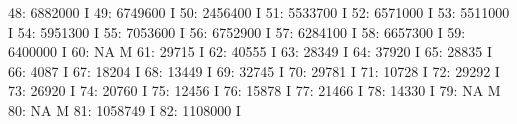 \documentclass[nojss]{jss}
\begin{document}
\begin{Schunk}
\begin{Soutput}
 48:                    6882000                                          I
 49:                    6749600                                          I
 50:                    2456400                                          I
 51:                    5533700                                          I
 52:                    6571000                                          I
 53:                    5511000                                          I
 54:                    5951300                                          I
 55:                    7053600                                          I
 56:                    6752900                                          I
 57:                    6284100                                          I
 58:                    6657300                                          I
 59:                    6400000                                          I
 60:                         NA                                          M
 61:                      29715                                          I
 62:                      40555                                          I
 63:                      28349                                          I
 64:                      37920                                          I
 65:                      28835                                          I
 66:                       4087                                          I
 67:                      18204                                          I
 68:                      13449                                          I
 69:                      32745                                          I
 70:                      29781                                          I
 71:                      10728                                          I
 72:                      29292                                          I
 73:                      26920                                          I
 74:                      20760                                          I
 75:                      12456                                          I
 76:                      15878                                          I
 77:                      21466                                          I
 78:                      14330                                          I
 79:                         NA                                          M
 80:                         NA                                          M
 81:                    1058749                                          I
 82:                    1108000                                          I

\end{Soutput}
\end{Schunk}
\end{document}
